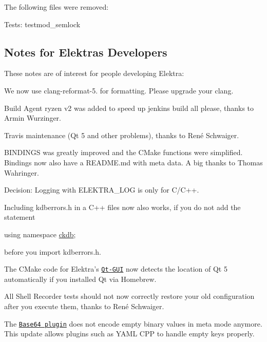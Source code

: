 The following files were removed\+:


\begin{DoxyItemize}
\item Tests\+: {\ttfamily testmod\+\_\+semlock}
\end{DoxyItemize}

\subsection*{Notes for Elektra\textquotesingle{}s Developers}

These notes are of interest for people developing Elektra\+:


\begin{DoxyItemize}
\item We now use {\ttfamily clang-\/reformat-\/5.} for formatting. Please upgrade your clang.
\item Build Agent {\ttfamily ryzen v2} was added to speed up {\ttfamily jenkins build all please}, thanks to Armin Wurzinger.
\item Travis maintenance (Qt 5 and other problems), thanks to René Schwaiger.
\item {\ttfamily B\+I\+N\+D\+I\+N\+GS} was greatly improved and the C\+Make functions were simplified. Bindings now also have a {\ttfamily R\+E\+A\+D\+M\+E.\+md} with meta data. A big thanks to Thomas Wahringer.
\item Decision\+: Logging with {\ttfamily E\+L\+E\+K\+T\+R\+A\+\_\+\+L\+OG} is only for C/\+C++.
\item Including {\ttfamily kdberrors.\+h} in a C++ files now also works, if you do not add the statement
\end{DoxyItemize}


\begin{DoxyCode}
\textcolor{keyword}{using namespace }\hyperlink{namespaceckdb}{ckdb};
\end{DoxyCode}


before you import {\ttfamily kdberrors.\+h}.
\begin{DoxyItemize}
\item The C\+Make code for Elektra’s \href{https://www.libelektra.org/tools/qt-gui}{\tt Qt-\/\+G\+UI} now detects the location of Qt 5 automatically if you installed Qt via Homebrew.
\item All Shell Recorder tests should not now correctly restore your old configuration after you execute them, thanks to René Schwaiger.
\item The \href{https://www.libelektra.org/plugins/base64}{\tt Base64 plugin} does not encode empty binary values in meta mode anymore. This update allows plugins such as Y\+A\+ML C\+PP to handle empty keys properly.
\end{DoxyItemize}

